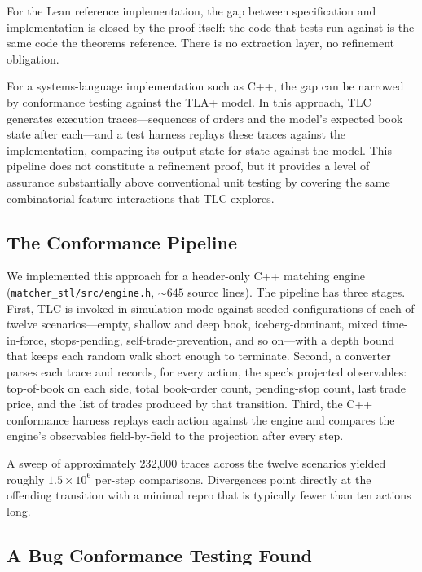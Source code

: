 \documentclass[11pt,a4paper]{article}
\begin{document}
For the Lean reference implementation, the gap between specification and
implementation is closed by the proof itself: the code that tests run
against is the same code the theorems reference. There is no extraction
layer, no refinement obligation.

For a systems-language implementation such as C++, the gap can be
narrowed by conformance testing against the TLA+ model. In this
approach, TLC generates execution traces---sequences of orders and the
model's expected book state after each---and a test harness replays
these traces against the implementation, comparing its output
state-for-state against the model. This pipeline does not constitute a
refinement proof, but it provides a level of assurance substantially
above conventional unit testing by covering the same combinatorial
feature interactions that TLC explores.

\subsection{The Conformance Pipeline}
\label{sec:conformance-pipeline}

We implemented this approach for a header-only C++ matching engine
(\texttt{matcher\_stl/src/engine.h}, ${\sim}645$ source lines). The
pipeline has three stages. First, TLC is invoked in simulation mode
against seeded configurations of each of twelve scenarios---empty,
shallow and deep book, iceberg-dominant, mixed time-in-force,
stops-pending, self-trade-prevention, and so on---with a depth bound
that keeps each random walk short enough to terminate. Second, a
converter parses each trace and records, for every action, the
spec's projected observables: top-of-book on each side, total
book-order count, pending-stop count, last trade price, and the
list of trades produced by that transition. Third, the C++
conformance harness replays each action against the engine and
compares the engine's observables field-by-field to the projection
after every step.

A sweep of approximately 232{,}000 traces across the twelve
scenarios yielded roughly $1.5\times 10^{6}$ per-step comparisons.
Divergences point directly at the offending transition with a
minimal repro that is typically fewer than ten actions long.

\subsection{A Bug Conformance Testing Found}
\label{sec:cpp005}
\end{document}
